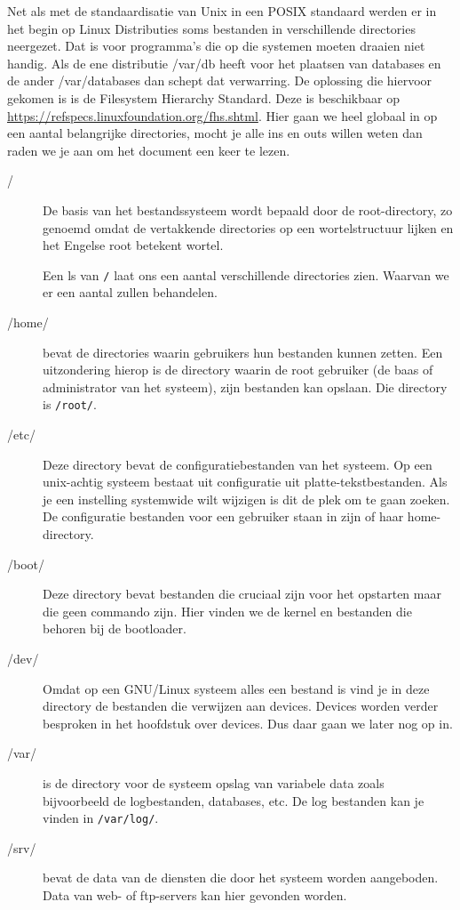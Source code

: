 Net als met de standaardisatie van Unix in een POSIX standaard werden er in het begin op Linux Distributies soms bestanden in verschillende directories neergezet. Dat is voor programma's die op die systemen moeten draaien niet handig. Als de ene distributie /var/db heeft voor het plaatsen van databases en de ander /var/databases dan schept dat verwarring. De oplossing die hiervoor gekomen is is de Filesystem Hierarchy Standard. Deze is beschikbaar op \url{https://refspecs.linuxfoundation.org/fhs.shtml}. Hier gaan we heel globaal in op een aantal belangrijke directories, mocht je alle ins en outs willen weten dan raden we je aan om het document een keer te lezen.

\begin{description}
\item [/] De basis van het bestandssysteem wordt bepaald door de root-directory, zo genoemd omdat de vertakkende directories op een wortelstructuur lijken en het Engelse root betekent wortel.

Een ls van \texttt{/} laat ons een aantal verschillende directories zien. Waarvan we er een aantal zullen behandelen.

\item [/home/] bevat de directories waarin gebruikers hun bestanden kunnen zetten. Een uitzondering hierop is de directory waarin de root gebruiker (de baas of administrator van het systeem), zijn bestanden kan opslaan. Die directory is \texttt{/root/}.

\item [/etc/] Deze directory bevat de configuratiebestanden van het systeem. Op een unix-achtig systeem bestaat uit configuratie uit platte-tekstbestanden. Als je een instelling systemwide wilt wijzigen is dit de plek om te gaan zoeken. De configuratie bestanden voor een gebruiker staan in zijn of haar home-directory.

\item [/boot/] Deze directory bevat bestanden die cruciaal zijn voor het opstarten maar die geen commando zijn. Hier vinden we de kernel en bestanden die behoren bij de bootloader.

\item [/dev/] Omdat op een GNU/Linux systeem alles een bestand is vind je in deze directory de bestanden die verwijzen aan devices. Devices worden verder besproken in het hoofdstuk over devices. Dus daar gaan we later nog op in.

\item [/var/] is de directory voor de systeem opslag van variabele data zoals bijvoorbeeld de logbestanden, databases, etc. De log bestanden kan je vinden in \texttt{/var/log/}.

\item [/srv/] bevat de data van de diensten die door het systeem worden aangeboden. Data van web- of ftp-servers kan hier gevonden worden.
\end{description}

